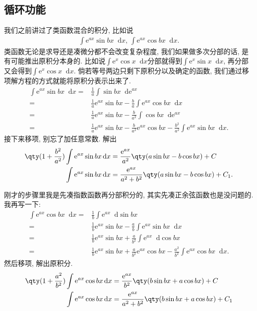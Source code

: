 \documentclass{ctexbook}
\newcommand{\e}{\mathrm{e}}
\newcommand*{\dif}{\mathop{}\!\mathrm{d}}
\begin{document}
{\subsection{循环功能}
我们之前讲过了\uppercase\expandafter{}类函数混合的积分, 比如说
\begin{align*}
\int\e^{ax}\sin{bx}\dif{x},\,\int\e^{ax}\cos{bx}\dif{x}
.\end{align*}
\uppercase\expandafter{}类函数无论是求导还是凑微分都不会改变复杂程度, 我们如果做多次分部的话, 是有可能推出原积分本身的. 比如说$\int\e^{x}\cos{x}\dif{x}$分部就得到$\int\e^{x}\sin{x}\dif{x}$, 再分部又会得到$\int\e^{x}\cos{x}\dif{x}$. 倘若等号两边只剩下原积分以及确定的函数, 我们通过移项解方程的方式就能将原积分表示出来了. 
\begin{align*}
\int\e^{ax}\sin{bx}\dif{x}={}&\frac{1}{a}\int\sin{bx}\dif{\e^{ax}}\\
={}&\frac{1}{a}\e^{ax}\sin{bx}-\frac{b}{a}\int\e^{ax}\cos{bx}\dif{x}\\
={}&\frac{1}{a}\e^{ax}\sin{bx}-\frac{b}{a^{2}}\int\cos{bx}\dif{\e^{ax}}\\
={}&\frac{1}{a}\e^{ax}\sin{bx}-\frac{b}{a^{2}}\e^{ax}\cos{bx}-\frac{b^{2}}{a^{2}}\int\e^{ax}\sin{bx}\dif{x}
.\end{align*}
接下来移项, 别忘了加任意常数. 解出
\begin{align*}
\qty(1+\frac{b^{2}}{a^{2}})\int\e^{ax}\sin{bx}\dif{x}={}&\frac{\e^{ax}}{a^{2}}\qty(a\sin{bx}-b\cos{bx})+C\\
\int\e^{ax}\sin{bx}\dif{x}={}&\frac{\e^{ax}}{a^{2}+b^{2}}\qty(a\sin{bx}-b\cos{bx})+C_{1}
.\end{align*}\par
刚才的步骤里我是先凑指数函数再分部积分的, 其实先凑正余弦函数也是没问题的. 我再写一下: 
\begin{align*}
\int\e^{ax}\cos{bx}\dif{x}={}&\frac{1}{b}\int\e^{ax}\dif{\sin{bx}}\\
={}&\frac{1}{b}\e^{ax}\sin{bx}-\frac{a}{b}\int\e^{ax}\sin{bx}\dif{x}\\
={}&\frac{1}{b}\e^{ax}\sin{bx}+\frac{a}{b^{2}}\int\e^{ax}\dif{\cos{bx}}\\
={}&\frac{1}{b}\e^{ax}\sin{bx}+\frac{a}{b^{2}}\e^{ax}\cos{bx}-\frac{a^{2}}{b^{2}}\int\e^{ax}\cos{bx}\dif{x}
.\end{align*}
然后移项, 解出原积分. 
\begin{align*}
\qty(1+\frac{a^{2}}{b^{2}})\int\e^{ax}\cos{bx}\dif{x}={}&\frac{\e^{ax}}{b^{2}}\qty(b\sin{bx}+a\cos{bx})+C\\
\int\e^{ax}\cos{bx}\dif{x}={}&\frac{\e^{ax}}{a^{2}+b^{2}}\qty(b\sin{bx}+a\cos{bx})+C_{1}

\end{align*}}
\end{document}
